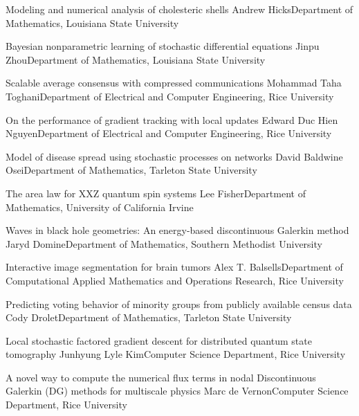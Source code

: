\begin{postersPG}
\item\poster %
{Modeling and numerical analysis of cholesteric shells}
{Andrew Hicks}{Department of Mathematics, Louisiana State University}

\item\poster %
{Bayesian nonparametric learning of stochastic differential equations}
{Jinpu Zhou}{Department of Mathematics, Louisiana State University}

\item\poster %
{Scalable average consensus with compressed communications}
{Mohammad Taha Toghani}{Department of Electrical and Computer Engineering, Rice University}

\item\poster %
{On the performance of gradient tracking with local updates}
{Edward Duc Hien Nguyen}{Department of Electrical and Computer Engineering, Rice University}

\item\poster %
{Model of disease spread using stochastic processes on networks}
{David Baldwine Osei}{Department of Mathematics, Tarleton State University}

\item\poster %
{The area law for XXZ quantum spin systems}
{Lee Fisher}{Department of Mathematics, University of California Irvine}

\item\poster %
{Waves in black hole geometries: An energy-based discontinuous Galerkin method}
{Jaryd Domine}{Department of Mathematics, Southern Methodist University}

\item\poster %
{Interactive image segmentation for brain tumors}
{Alex T. Balsells}{Department of Computational Applied Mathematics and Operations Research, Rice University}

\item\poster %
{Predicting voting behavior of minority groups from publicly available census data}
{Cody Drolet}{Department of Mathematics, Tarleton State University}

\item\poster %
{Local stochastic factored gradient descent for distributed quantum state tomography}
{Junhyung Lyle Kim}{Computer Science Department, Rice University}

\item\poster %
{A novel way to compute the numerical flux terms in nodal Discontinuous Galerkin (DG) methods for multiscale physics}
{Marc de Vernon}{Computer Science Department, Rice University}


\end{postersPG}

